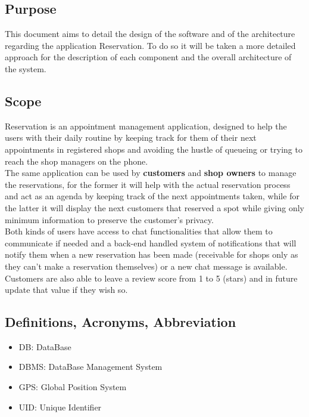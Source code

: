 \subsection{Purpose}
This document aims to detail the design of the software and of the architecture regarding the application Reservation.
To do so it will be taken a more detailed approach for the description of each component and the overall architecture of the system.

\subsection{Scope}
Reservation is an appointment management application, designed to help the users with their daily routine by keeping track for them of their next appointments in registered shops and avoiding the hustle of queueing or trying to reach the shop managers on the phone.\\
The same application can be used by \textbf{customers} and \textbf{shop owners} to manage the reservations, for the former it will help with the actual reservation process and act as an agenda by keeping track of the next appointments taken, while for the latter it will display the next customers that reserved a spot while giving only minimum information to preserve the customer's privacy.\\
Both kinds of users have access to chat functionalities that allow them to communicate if needed and a back-end handled system of notifications that will notify them when a new reservation has been made (receivable for shops only as they can't make a reservation themselves) or a new chat message is available.\\
Customers are also able to leave a review score from 1 to 5 (stars) and in future update that value if they wish so.

\subsection{Definitions, Acronyms, Abbreviation}
\begin{itemize}
\item DB: DataBase
\item DBMS: DataBase Management System
\item GPS: Global Position System
\item UID: Unique Identifier
\end{itemize}


